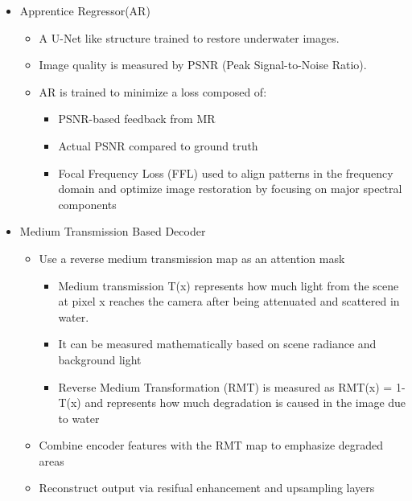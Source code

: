 \begin{itemize}
    \item Apprentice Regressor(AR)
          \begin{itemize}
              \item A U-Net like structure trained to restore underwater images.
              \item Image quality is measured by PSNR (Peak Signal-to-Noise Ratio).
              \item AR is trained to minimize a loss composed of:
                    \begin{itemize}
                        \item PSNR-based feedback from MR
                        \item Actual PSNR compared to ground truth
                        \item Focal Frequency Loss (FFL) used to align patterns in the frequency domain and optimize image restoration by focusing on major spectral components
                    \end{itemize}
          \end{itemize}

    \item Medium Transmission Based Decoder
          \begin{itemize}
              \item Use a reverse medium transmission map as an attention mask
                    \begin{itemize}
                        \item Medium transmission T(x) represents how much light from the scene at pixel x reaches the camera after being attenuated and scattered in water.
                        \item It can be measured mathematically based on scene radiance and background light
                        \item Reverse Medium Transformation (RMT) is measured as RMT(x) = 1-T(x) and represents how much degradation is caused in the image due to water
                    \end{itemize}
              \item Combine encoder features with the RMT map to emphasize degraded areas
              \item Reconstruct output via resifual enhancement and upsampling layers
          \end{itemize}
\end{itemize}

